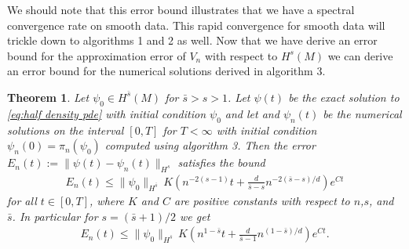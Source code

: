 \documentclass[12pt]{amsart}
\newtheorem{thm}{Theorem}[section]
\begin{document}
We should note that this error bound illustrates that we have a spectral convergence rate on smooth data.
This rapid convergence for smooth data will trickle down to algorithms 1 and 2 as well.
Now that we have derive an error bound for the approximation error of $V_{n}$ with respect to $H^{s}(M)$ we can 
derive an error bound for the numerical solutions derived in algorithm 3.

\begin{thm} \label{thm:half density convergence}
	Let $\psi_{0} \in H^{\bar{s}}(M)$ for $\bar{s} > s > 1$.
	Let $\psi(t)$ be the exact solution to \eqref{eq:half density pde} with initial condition $\psi_{0}$ and let
	and $\psi_{n}(t)$ be the numerical solutions on the interval $[0,T]$ for $T < \infty$ with initial condition $\psi_{n}(0) = \pi_{n}(\psi_{0})$
	computed using algorithm 3.
	Then the error $E_{n}(t) := \| \psi(t) - \psi_{n}(t) \|_{H^{s}}$ satisfies the bound
	\begin{align}
		E_{n}(t) \leq \| \psi_{0} \|_{H^{\bar{s}}} \, K \left( n^{-2(s-1)} t+  \frac{d}{\bar{s}-s} n^{-2(\bar{s}-s)/d} \right) e^{C t}
	\end{align}
	for all $t \in [0,T]$, where $K$ and $C$ are positive constants with respect to $n$,$s$, and $\bar{s}$.
	In particular for $s = (\bar{s}+1)/2$ we get
	\begin{align}
			E_{n}(t) \leq \| \psi_{0} \|_{H^{\bar{s}}} \, K \left( n^{1-\bar{s}} t+  \frac{d}{\bar{s}-1} n^{(1-\bar{s})/d} \right) e^{C t}.
	\end{align}
\end{thm}
\end{document}
